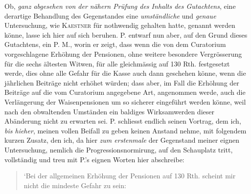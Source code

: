 Ob, \textit{ganz abgesehen von der nähern Prüfung des Inhalts des Gutachtens}, eine derartige Behandlung des Gegenstandes eine \textit{umständliche} und \textit{genaue} Untersuchung, wie \textsc{Kaestner} für nothwendig gehalten hatte, genannt werden könne, lasse ich hier auf sich beruhen. P. entwarf nun aber, auf den Grund dieses Gutachtens, ein P. M., worin er zeigt, dass wenn die von dem Curatorium vorgeschlagene Erhöhung der Pensionen, ohne weitere besondere Vergrösserung für die sechs ältesten Witwen, für alle gleichmässig auf 130 Rth. festgesetzt werde, dies ohne alle Gefahr für die Kasse auch dann geschehen könne, wenn die jährlichen Beiträge nicht erhöhet würden; dass aber, im Fall die Erhöhung der Beiträge auf die vom Curatorium angegebene Art, angenommen werde, auch die Verlängerung der Waisenpensionen um so sicherer eingeführt werden könne, weil nach den obwaltenden Umständen ein baldiges Wirksamwerden dieser Abänderung nicht zu erwarten sei. P. schliesst endlich seinen Vortrag, dem ich, \textit{bis hieher}, meinen vollen Beifall zu geben keinen Anstand nehme, mit folgendem kurzen Zusatz, den ich, da hier \textit{zum erstenmale} der Gegenstand meiner eignen Untersuchung, nemlich die Progressionsnormirung, auf den Schauplatz tritt, vollständig und treu mit P.’s eignen Worten hier abschreibe:

\begin{quote}
‘Bei der allgemeinen Erhöhung der Pensionen auf 130 Rth. scheint mir nicht die mindeste Gefahr zu sein:
\end{quote}
